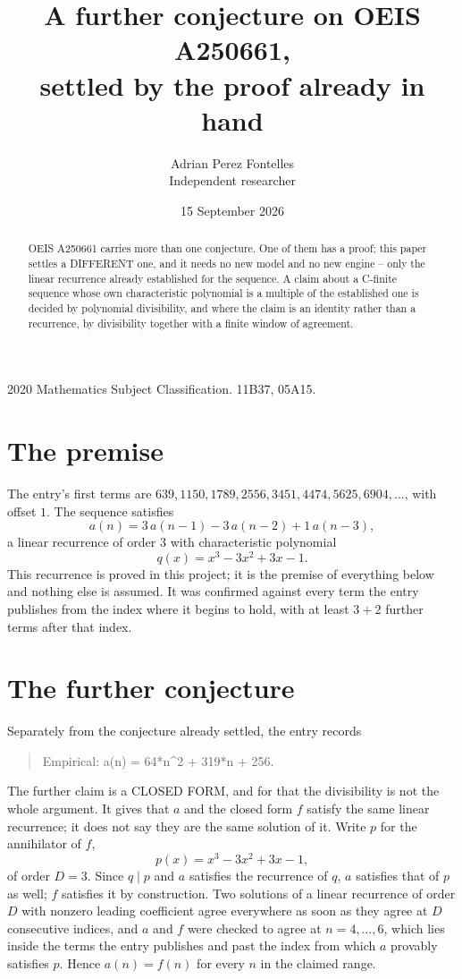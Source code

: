 \documentclass[11pt,a4paper]{article}
\title{A further conjecture on OEIS A250661,\\ \large settled by the proof already in hand}
\author{Adrian Perez Fontelles\\ \small Independent researcher}
\date{15 September 2026}
\theoremstyle{plain}
\theoremstyle{definition}
\begin{document}
\maketitle

\begin{abstract}
OEIS A250661 carries more than one conjecture. One of them has a proof; this paper settles a
DIFFERENT one, and it needs no new model and no new engine -- only the linear recurrence already
established for the sequence. A claim about a C-finite sequence whose own characteristic
polynomial is a multiple of the established one is decided by polynomial divisibility, and where
the claim is an identity rather than a recurrence, by divisibility together with a finite window
of agreement.
\end{abstract}

\noindent\small 2020 Mathematics Subject Classification. 11B37, 05A15.\normalsize

\section{The premise}

The entry's first terms are $639, 1150, 1789, 2556, 3451, 4474, 5625, 6904,\dots$, with offset $1$. The sequence satisfies
\[
  a(n)=3\,a(n-1) - 3\,a(n-2) + 1\,a(n-3) ,
\]
a linear recurrence of order $3$ with characteristic polynomial
\[
  q(x)=x^{3} - 3 x^{2} + 3 x - 1 .
\]
This recurrence is proved in this project; it is the premise of everything below and nothing else is assumed.
It was confirmed against every term the entry publishes from the index where it begins to hold,
with at least $3+2$ further terms after that index.

\section{The further conjecture}

Separately from the conjecture already settled, the entry records

\begin{quote}\raggedright Empirical: a(n) = 64*n\^{}2 + 319*n + 256.\end{quote}

The further claim is a CLOSED FORM, and for that the divisibility is not the whole argument. It
gives that $a$ and the closed form $f$ satisfy the same linear recurrence; it does not say they
are the same solution of it. Write $p$ for the annihilator of $f$,
\[
  p(x)=x^{3} - 3 x^{2} + 3 x - 1 ,
\]
of order $D=3$. Since $q\mid p$ and $a$ satisfies the recurrence of $q$, $a$ satisfies that of
$p$ as well; $f$ satisfies it by construction. Two solutions of a linear recurrence of order $D$
with nonzero leading coefficient agree everywhere as soon as they agree at $D$ consecutive
indices, and $a$ and $f$ were checked to agree at $n=4,\dots,6$,
which lies inside the terms the entry publishes and past the index from which $a$ provably
satisfies $p$. Hence $a(n)=f(n)$ for every $n$ in the claimed range.
\end{document}
